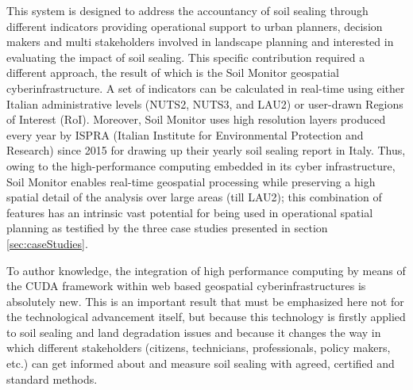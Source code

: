 \documentclass[APA,LATO1COL,doublespace]{WileyNJD-v2}
\newcommand{\update}[1]{\emph{\textcolor{blue}{#1}}}     %
\begin{document}
This system is designed to address the accountancy of soil sealing through different indicators providing operational support to urban planners, decision makers and multi stakeholders involved in landscape planning and interested in evaluating the impact of soil sealing. 
This specific contribution required a different approach, the result of which is the Soil Monitor geospatial cyberinfrastructure. 
A set of indicators can be calculated in real-time using either Italian administrative levels (NUTS2, NUTS3, and LAU2) or user-drawn Regions of Interest (RoI). 
Moreover, Soil Monitor uses high resolution layers produced every year by ISPRA (Italian Institute for Environmental Protection and Research) since 2015 for drawing up their yearly soil sealing report in Italy. 
Thus, owing to the high-performance computing embedded in its cyber infrastructure, Soil Monitor enables real-time geospatial processing while preserving a high spatial detail of the analysis over large areas (till LAU2); this combination of features has an intrinsic vast potential for being used in operational spatial planning as testified by the three case studies presented in section \ref{sec:caseStudies}. 

To author knowledge, the
integration of high performance computing by means of the CUDA framework within web based geospatial cyberinfrastructures is absolutely new.
This is an important result that must be emphasized here not for the technological advancement itself, but because this technology is firstly applied to soil sealing and land degradation issues and because it changes the way in which different stakeholders (citizens, technicians, professionals, policy makers, etc.) can get informed about and measure soil sealing with agreed, certified and standard methods.
\end{document}
